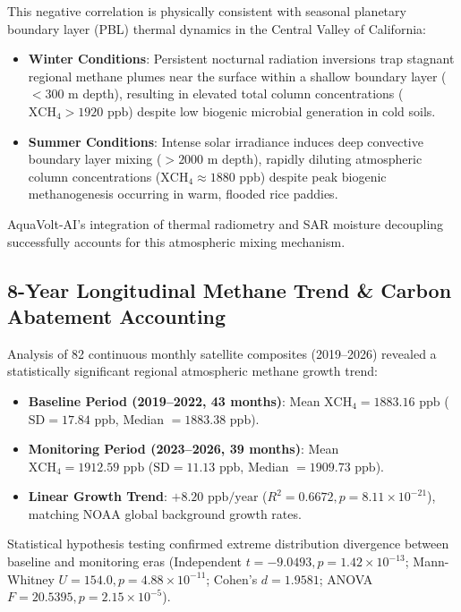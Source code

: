 \documentclass[sn-mathphys-num,Numbered]{sn-jnl}
\begin{document}
This negative correlation is physically consistent with seasonal planetary boundary layer (PBL) thermal dynamics in the Central Valley of California:
\begin{itemize}
    \item \textbf{Winter Conditions}: Persistent nocturnal radiation inversions trap stagnant regional methane plumes near the surface within a shallow boundary layer ($<300\text{ m}$ depth), resulting in elevated total column concentrations ($\mathrm{XCH}_4 > 1920\text{ ppb}$) despite low biogenic microbial generation in cold soils.
    \item \textbf{Summer Conditions}: Intense solar irradiance induces deep convective boundary layer mixing ($>2000\text{ m}$ depth), rapidly diluting atmospheric column concentrations ($\mathrm{XCH}_4 \approx 1880\text{ ppb}$) despite peak biogenic methanogenesis occurring in warm, flooded rice paddies.
\end{itemize}
AquaVolt-AI's integration of thermal radiometry and SAR moisture decoupling successfully accounts for this atmospheric mixing mechanism.

\subsection{8-Year Longitudinal Methane Trend \& Carbon Abatement Accounting}\label{sec:results_8yr_trend}
Analysis of 82 continuous monthly satellite composites (2019--2026) revealed a statistically significant regional atmospheric methane growth trend:
\begin{itemize}
    \item \textbf{Baseline Period (2019--2022, 43 months)}: Mean $\mathrm{XCH}_4 = 1883.16\text{ ppb}$ ($\text{SD} = 17.84\text{ ppb}$, Median $= 1883.38\text{ ppb}$).
    \item \textbf{Monitoring Period (2023--2026, 39 months)}: Mean $\mathrm{XCH}_4 = 1912.59\text{ ppb}$ ($\text{SD} = 11.13\text{ ppb}$, Median $= 1909.73\text{ ppb}$).
    \item \textbf{Linear Growth Trend}: $+8.20\text{ ppb/year}$ ($R^2 = 0.6672, p = 8.11 \times 10^{-21}$), matching NOAA global background growth rates.
\end{itemize}

Statistical hypothesis testing confirmed extreme distribution divergence between baseline and monitoring eras (Independent $t = -9.0493, p = 1.42 \times 10^{-13}$; Mann-Whitney $U = 154.0, p = 4.88 \times 10^{-11}$; Cohen's $d = 1.9581$; ANOVA $F = 20.5395, p = 2.15 \times 10^{-5}$).
\end{document}

